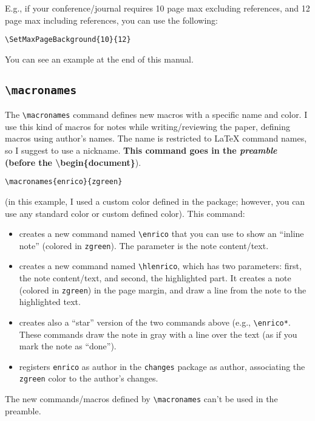\documentclass[a4paper]{article}
\newcommand\B[1]{\texttt{\textbackslash #1}}
\begin{document}
E.g., if your conference/journal requires 10 page max excluding references, and 12 page max including references, you can use the following:

\begin{verbatim}
\SetMaxPageBackground{10}{12}
\end{verbatim}

You can see an example at the end of this manual.

\subsection{\B{macronames}}

The \B{macronames} command defines new macros with a specific name and color. I use this kind of macros for notes while writing/reviewing the paper, defining macros using author's names. The name is restricted to LaTeX command names, so I suggest to use a nickname. \textbf{This command goes in the \textit{preamble} \\(before the \textbackslash begin\{document\}}).

\begin{verbatim}
\macronames{enrico}{zgreen}
\end{verbatim}

(in this example, I used a custom color defined in the package; however, you can use any standard color or custom defined color). This command:

\begin{itemize}
    \item creates a new command named \B{enrico} that you can use to show an ``inline note'' (colored in \texttt{zgreen}). The parameter is the note content/text.
    \item creates a new command named \B{hlenrico}, which has two parameters: first, the note content/text, and second, the highlighted part. It creates a note (colored in \texttt{zgreen}) in the page margin, and draw a line from the note to the highlighted text.
    \item creates also a ``star'' version of the two commands above (e.g., \B{enrico*}. These commands draw the note in gray with a line over the text (as if you mark the note as ``done'').
    \item registers \texttt{enrico} as author in the \texttt{changes} package as author, associating the \texttt{zgreen} color to the author's changes.
\end{itemize}

The new commands/macros defined by \B{macronames} can't be used in the preamble.
\end{document}
